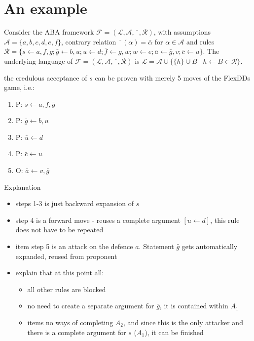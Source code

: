 \documentclass[conference]{IEEEtran}
\newtheorem{example}{Example}[section]
\newcommand{\frF}{\ensuremath{\mathcal{F}}\xspace}
\newcommand{\frL}{\ensuremath{\mathcal{L}}\xspace}
\newcommand{\frA}{\ensuremath{\mathcal{A}}\xspace}
\newcommand{\frCtr}{\ensuremath{\overline{\phantom{x}}}\xspace}
\newcommand{\frR}{\ensuremath{\mathcal{R}}\xspace}
\newcommand{\frTup}{\ensuremath{(\frL,\frA,\frCtr,\frR)}\xspace}
\newcommand{\fr}{\ensuremath{\frF = \frTup}\xspace}
\newcommand{\rulH}{\ensuremath{h}\xspace}
\newcommand{\rulB}{\ensuremath{B}\xspace}
\newcommand{\rul}{\ensuremath{\rulH \leftarrow \rulB}\xspace}
\newcommand{\rulA}[2]{\ensuremath{#1 \leftarrow #2}\xspace}
\newcommand{\argu}[1]{\ensuremath{A_{#1}}}
\newcommand{\arguInline}[2]{\ensuremath{[\rulA{#1}{#2}]}}
\newcommand{\stmt}[1]{\ensuremath{#1}}
\begin{document}
\section{An example}



Consider the ABA framework \fr, with assumptions $\frA = \{ a,b,c,d,e,f \}$, contrary relation $\frCtr(\alpha) = \bar{\alpha}$ for $\alpha \in \frA$ and rules $\frR = \{ \rulA{s}{a,f,g}; \rulA{\bar{g}}{b,u}; \rulA{u}{d}; \rulA{\bar{f}}{g,w}; \rulA{w}{e};\rulA{\bar{a}}{\bar{g},v};\rulA{\bar{c}}{u} \}$.  The underlying language of \fr is $\frL = \frA \cup \big\{ \{ \rulH \} \cup \rulB  \mid  \rul \in \frR \big\}$.

the credulous acceptance of $s$ can be proven with merely 5 moves of the FlexDDs game, i.e.:
  \begin{enumerate}
    \renewcommand{\labelenumi}{step \arabic{enumi}.}
    \item P: \rulA{s}{a,f,\bar{g}}
    \item P: \rulA{\bar{g}}{b,u}
    \item P: \rulA{\bar{u}}{d}
    \item P: \rulA{\bar{c}}{u}
    \item O: \rulA{\bar{a}}{v,\bar{g}}
  \end{enumerate}

Explanation

\begin{itemize}
    \item steps 1-3 is just backward expansion of \stmt{s} 
    \item step 4 is a forward move - reuses a complete argument \arguInline{u}{d}, this rule does not have to be repeated
    \item item step 5 is an attack on the defence \stmt{a}. Statement \stmt{\bar{g}} gets automatically expanded, reused from proponent
    \item explain that at this point all:
    \begin{itemize}
      \item all other rules are blocked
      \item no need to create a separate argument for \stmt{\bar{g}}, it is contained within \argu{1}
      \item items no ways of completing \argu{2}, and since this is the only attacker and there is a complete argument for \stmt{s} (\argu{1}), it can be finished
    \end{itemize}
  \end{itemize}  
  
\end{document}
